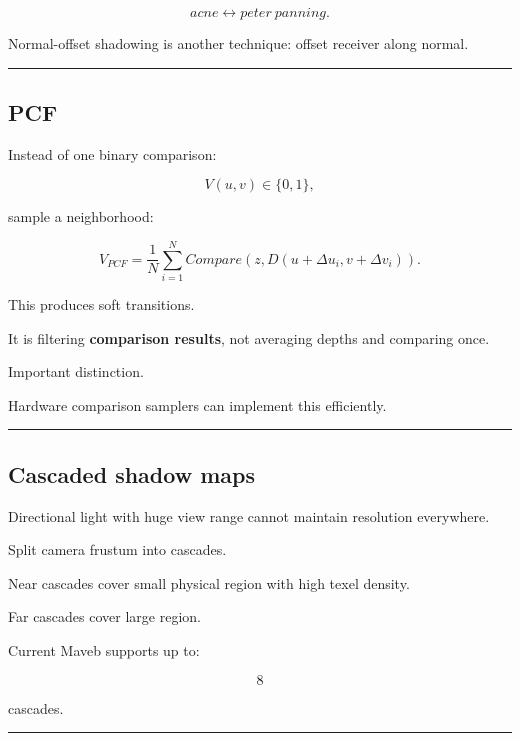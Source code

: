 \[
acne
\leftrightarrow
peter\ panning.
\]

Normal-offset shadowing is another technique: offset receiver along normal.

\begin{center}\rule{0.5\linewidth}{0.5pt}\end{center}

\subsection{PCF}\label{04-visual-computing-ii-ch040-pcf}

\hypertarget{04-visual-computing-ii-ch040-pcf}{}

Instead of one binary comparison:

\[
V(u,v)\in\{0,1\},
\]

sample a neighborhood:

\[
\boxed{
V_{PCF}
=
\frac1N
\sum_{i=1}^{N}
Compare(
z,
D(u+\Delta u_i,v+\Delta v_i)
).
}
\]

This produces soft transitions.

It is filtering \textbf{comparison results}, not averaging depths and comparing once.

Important distinction.

Hardware comparison samplers can implement this efficiently.

\begin{center}\rule{0.5\linewidth}{0.5pt}\end{center}

\subsection{Cascaded shadow maps}\label{04-visual-computing-ii-ch040-cascaded-shadow-maps}

\hypertarget{04-visual-computing-ii-ch040-cascaded-shadow-maps}{}

Directional light with huge view range cannot maintain resolution everywhere.

Split camera frustum into cascades.

Near cascades cover small physical region with high texel density.

Far cascades cover large region.

Current Maveb supports up to:

\[
8
\]

cascades.

\begin{center}\rule{0.5\linewidth}{0.5pt}\end{center}

